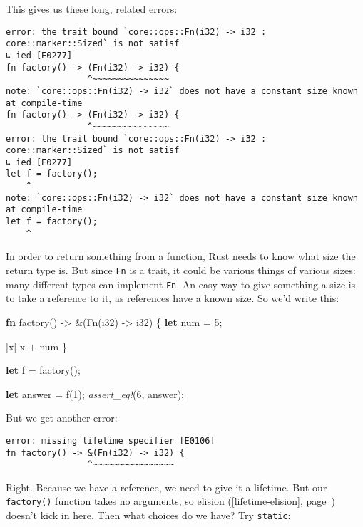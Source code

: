 \documentclass[a4paper,]{book}
\renewcommand*{\hyperlink}[2]{%
 #2 (\autoref{#1}, page~\pageref{#1})}
\newenvironment{Shaded}{\begin{snugshade}}{\end{snugshade}}
\newcommand{\KeywordTok}[1]{\textcolor[rgb]{0.13,0.29,0.53}{\textbf{{#1}}}}
\newcommand{\DataTypeTok}[1]{\textcolor[rgb]{0.13,0.29,0.53}{{#1}}}
\newcommand{\DecValTok}[1]{\textcolor[rgb]{0.00,0.00,0.81}{{#1}}}
\newcommand{\BuiltInTok}[1]{{#1}}
\newcommand{\PreprocessorTok}[1]{\textcolor[rgb]{0.56,0.35,0.01}{\textit{{#1}}}}
\newcommand{\NormalTok}[1]{{#1}}
\begin{document}
This gives us these long, related errors:

\begin{verbatim}
error: the trait bound `core::ops::Fn(i32) -> i32 : core::marker::Sized` is not satisf
↳ ied [E0277]
fn factory() -> (Fn(i32) -> i32) {
                ^~~~~~~~~~~~~~~~
note: `core::ops::Fn(i32) -> i32` does not have a constant size known at compile-time
fn factory() -> (Fn(i32) -> i32) {
                ^~~~~~~~~~~~~~~~
error: the trait bound `core::ops::Fn(i32) -> i32 : core::marker::Sized` is not satisf
↳ ied [E0277]
let f = factory();
    ^
note: `core::ops::Fn(i32) -> i32` does not have a constant size known at compile-time
let f = factory();
    ^
\end{verbatim}

In order to return something from a function, Rust needs to know what
size the return type is. But since \texttt{Fn} is a trait, it could be
various things of various sizes: many different types can implement
\texttt{Fn}. An easy way to give something a size is to take a reference
to it, as references have a known size. So we'd write this:

\begin{Shaded}
\begin{Highlighting}[]
\KeywordTok{fn} \NormalTok{factory() -> &(}\BuiltInTok{Fn}\NormalTok{(}\DataTypeTok{i32}\NormalTok{) -> }\DataTypeTok{i32}\NormalTok{) \{}
    \KeywordTok{let} \NormalTok{num = }\DecValTok{5}\NormalTok{;}

    \NormalTok{|x| x + num}
\NormalTok{\}}

\KeywordTok{let} \NormalTok{f = factory();}

\KeywordTok{let} \NormalTok{answer = f(}\DecValTok{1}\NormalTok{);}
\PreprocessorTok{assert_eq!}\NormalTok{(}\DecValTok{6}\NormalTok{, answer);}
\end{Highlighting}
\end{Shaded}

But we get another error:

\begin{verbatim}
error: missing lifetime specifier [E0106]
fn factory() -> &(Fn(i32) -> i32) {
                ^~~~~~~~~~~~~~~~~
\end{verbatim}

Right. Because we have a reference, we need to give it a lifetime. But
our \texttt{factory()} function takes no arguments, so
\protect\hyperlink{lifetime-elision}{elision} doesn't kick in here. Then
what choices do we have? Try \texttt{\textquotesingle{}static}:
\end{document}
